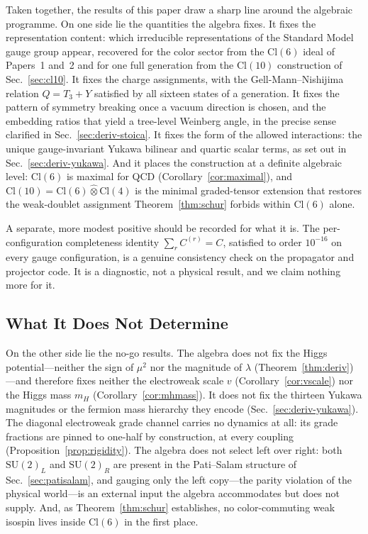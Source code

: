 \documentclass[12pt]{article}
\theoremstyle{remark}
\newcommand{\cl}{\mathrm{Cl}}
\newcommand{\su}{\mathrm{SU}}
\newcommand{\grtensor}{\mathbin{\widehat{\otimes}}}  %
\begin{document}
Taken together, the results of this paper draw a sharp line around the algebraic
programme.  On one side lie the quantities the algebra fixes.  It fixes the
representation content: which irreducible representations of the Standard Model
gauge group appear, recovered for the color sector from the $\cl(6)$ ideal of
Papers~1 and~2 and for one full generation from the $\cl(10)$ construction of
Sec.~\ref{sec:cl10}.  It fixes the charge assignments, with the
Gell-Mann--Nishijima relation $Q=T_3+Y$ satisfied by all sixteen states of a
generation.  It fixes the pattern of symmetry breaking once a vacuum direction
is chosen, and the embedding ratios that yield a tree-level Weinberg angle, in
the precise sense clarified in Sec.~\ref{sec:deriv-stoica}.  It fixes the form of
the allowed interactions: the unique gauge-invariant Yukawa bilinear and quartic
scalar terms, as set out in Sec.~\ref{sec:deriv-yukawa}.  And it places the
construction at a definite algebraic level: $\cl(6)$ is maximal for QCD
(Corollary~\ref{cor:maximal}), and $\cl(10)=\cl(6)\grtensor\cl(4)$ is the minimal
graded-tensor extension that restores the weak-doublet assignment
Theorem~\ref{thm:schur} forbids within $\cl(6)$ alone.

A separate, more modest positive should be recorded for what it is.  The
per-configuration completeness identity $\sum_r C^{(r)}=C$, satisfied to order
$10^{-16}$ on every gauge configuration, is a genuine consistency check on the
propagator and projector code.  It is a diagnostic, not a physical result, and
we claim nothing more for it.

\subsection{What It Does Not Determine}
\label{sec:cannot-do}

On the other side lie the no-go results.  The algebra does not fix the Higgs
potential---neither the sign of $\mu^2$ nor the magnitude of $\lambda$
(Theorem~\ref{thm:deriv})---and therefore fixes neither the electroweak scale
$v$ (Corollary~\ref{cor:vscale}) nor the Higgs mass $m_H$
(Corollary~\ref{cor:mhmass}).  It does not fix the thirteen Yukawa magnitudes or
the fermion mass hierarchy they encode (Sec.~\ref{sec:deriv-yukawa}).  The
diagonal electroweak grade channel carries no dynamics at all: its grade
fractions are pinned to one-half by construction, at every coupling
(Proposition~\ref{prop:rigidity}).  The algebra does not select left over right:
both $\su(2)_L$ and $\su(2)_R$ are present in the Pati--Salam structure of
Sec.~\ref{sec:patisalam}, and gauging only the left copy---the parity violation
of the physical world---is an external input the algebra accommodates but does
not supply.  And, as Theorem~\ref{thm:schur} establishes, no color-commuting
weak isospin lives inside $\cl(6)$ in the first place.
\end{document}

